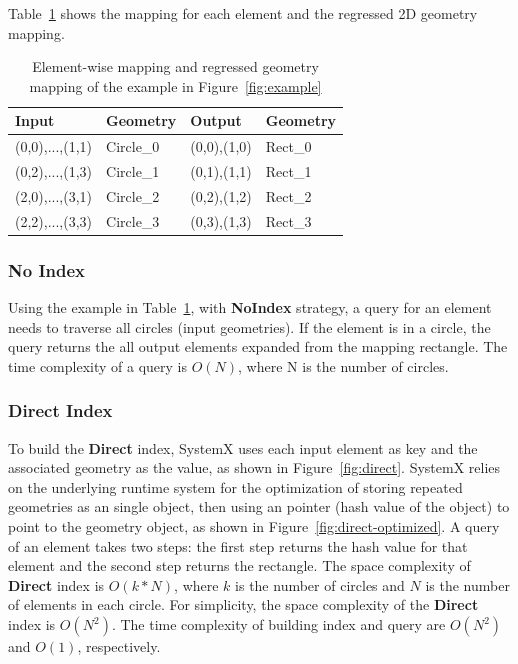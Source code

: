 \documentclass{sig-alternate}
\begin{document}
Table~\ref{tb:example} shows the mapping for each element and the regressed 2D geometry mapping.
\begin{table}[t]
\begin{center}
    \caption{Element-wise mapping and regressed geometry mapping of the example in Figure~\ref{fig:example}}
    \begin{scriptsize}
    \begin{tabular}{ | p{1.75cm} | p{1.75cm} | p{1.75cm} | p{1.75cm} |}
    \hline
    Input & Geometry & Output & Geometry \\ \hline \hline
    (0,0),...,(1,1) & Circle\_0 & (0,0),(1,0) & Rect\_0 \\ \hline
    (0,2),...,(1,3) & Circle\_1 & (0,1),(1,1) & Rect\_1 \\ \hline
    (2,0),...,(3,1) & Circle\_2 & (0,2),(1,2) & Rect\_2 \\ \hline
    (2,2),...,(3,3) & Circle\_3 & (0,3),(1,3) & Rect\_3 \\ \hline
    \end{tabular}
    \end{scriptsize}
    \label{tb:example}
\end{center}   
\end{table} 

\subsubsection{No Index}
Using the example in Table~\ref{tb:example}, with {\bf NoIndex} strategy, a query for an element needs to traverse all circles (input geometries).
If the element is in a circle, the query returns the all output elements expanded from the mapping rectangle.
The time complexity of a query is $O(N)$, where N is the number of circles. 

\subsubsection{Direct Index}
To build the {\bf Direct} index, SystemX uses each input element as key and the associated geometry as the value, as shown in Figure~\ref{fig:direct}.
SystemX relies on the underlying runtime system for the optimization of storing repeated geometries as an single object,
then using an pointer (hash value of the object) to point to the geometry object, as shown in Figure~\ref{fig:direct-optimized}.
A query of an element takes two steps: the first step returns the hash value for that element and the second step returns the rectangle. 
The space complexity of {\bf Direct} index is $O(k*N)$, where $k$ is the number of circles and $N$ is the number of elements in each circle.
For simplicity, the space complexity of the {\bf Direct} index is $O(N^2)$.
The time complexity of building index and query are $O(N^2)$ and $O(1)$, respectively.
\end{document}
